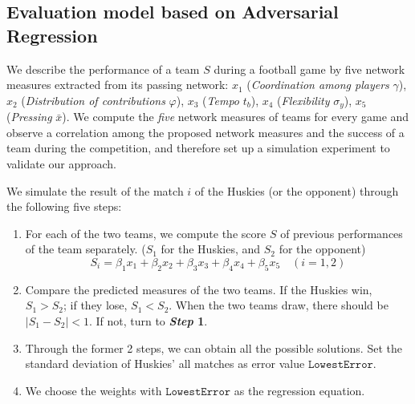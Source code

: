 \documentclass[12pt]{article}  %
\begin{document}
\subsection{Evaluation model based on Adversarial Regression}
We describe the performance of a team $S$ during a football game by five network measures extracted from its passing network:  $x_1$ (\textit{Coordination among players} $\gamma$),
$x_2$  (\textit{Distribution of contributions} $\varphi$),
$x_3$  (\textit{Tempo} $t_b$),
$x_4$  (\textit{Flexibility} $\sigma_y$),
$x_5$  (\textit{Pressing} $\bar{x}$). We compute the \textit{five} network measures of teams for every game and observe a correlation among the proposed network measures and the success of a team during the competition, and therefore set up a simulation experiment to validate our approach. 

 We simulate the result of the match $i$ of the Huskies (or the opponent) through the following five steps:
\begin{enumerate}
    \item For each of the two teams, we compute the score $S$ of previous performances of the team separately. ($S_1$ for the Huskies, and $S_2$ for the opponent)
    \begin{equation}\label{eq:regression}
        S_i=\beta_1 x_1+\beta_2 x_2+\beta_3 x_3+\beta_4 x_4+\beta_5 x_5\quad(i=1,2)
    \end{equation}
    \item Compare the predicted measures of the two teams. If the Huskies win, $ S_1> S_2 $; if they lose, $ S_1 <S_2 $. When the two teams draw, there should be $ \left| S_1-S_2 \right| <1 $. If not, turn to \textbf{\textit{Step }1}. 
    \item Through the former 2 steps, we can obtain all the possible solutions. Set the standard deviation of Huskies' all matches as error value ${\mathtt{LowestError}}$. 
    \item  We choose the weights with ${\mathtt{LowestError}}$ as the regression equation.
\end{enumerate}
\end{document}
